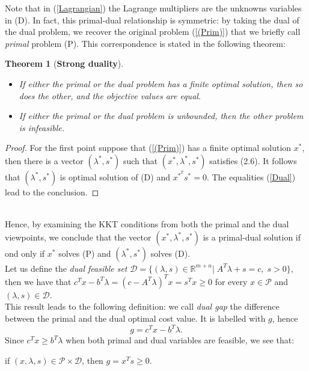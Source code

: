 \documentclass[a4paper,10 pt,titlepage,twoside]{report}
\theoremstyle{plain}
\newtheorem{thm}{Theorem}[chapter]
\theoremstyle{definition}
\theoremstyle{remark}
\begin{document}
Note that in (\ref{Lagrangian}) the Lagrange multipliers are the unknowns variables in (D). In fact, this primal-dual relationship is symmetric: by taking the dual of the dual problem, we recover the original problem (\ref{(Prim)}) that we briefly call \textit{primal} problem (P). This correspondence is stated in the following theorem:
\begin{thm}[\textbf{Strong duality}] 
	\begin{itemize}
		\
		\item If either the primal or the dual problem has a finite optimal solution, then so does the other, and the objective values are equal.
		\item If either the primal or the dual problem is unbounded, then the other problem is infeasible.
	\end{itemize}
\end{thm}
\begin{proof}
For the first point suppose that (\ref{(Prim)}) has a finite optimal solution $x^{*}$, then there is a vector $(\lambda^{*},s^{*})$ such that $\left(x^{*},\lambda^{*},s^{*}\right)$ satisfies (2.6). It follows that $\left(\lambda^{*},s^{*}\right)$ is optimal solution of (D) and $x^{*}^{T}s^{*}=0$. The equalities (\ref{Dual}) lead to the conclusion. 
\end{proof}
\\[0.5 cm] Hence, by examining the KKT conditions from both the primal and the dual viewpoints, we conclude that the vector $(x^{*},\lambda^{*},s^{*})$ is a primal-dual solution if ond only if $x^{*}$ solves (P) and $(\lambda^{*},s^{*})$ solves (D).\\[1cm]
Let us define the \textit{dual feasible set} $\mathcal{D}=\{(\lambda,s)\in\mathbb{R}^{m+n}|\;A^{T}\lambda+s= c,\;s>0\}$, then we have that $c^{T}x-b^{T}\lambda=\left(c-A^{T}\lambda\right)^{T}x=s^{T}x \geq0$ for every $x\in\mathcal{P}$ and $\left(\lambda,s\right)\in\mathcal{D}$.\\
This result leads to the following definition: we call \textit{dual gap} the difference between the primal and the dual optimal cost value. It is labelled with $g$, hence
\begin{equation}\label{dualgap}\tag{2.8}
g = c^{T}x - b^{T}\lambda.
\end{equation}
Since $c^{T}x\geq b^{T}\lambda$ when both primal and dual variables are feasible, we see that:\begin{center}
	if $(x,\lambda,s)\in\mathcal{P}\times\mathcal{D}$, then $g= x^{T}s \geq0$.
\end{center}
\end{document}
